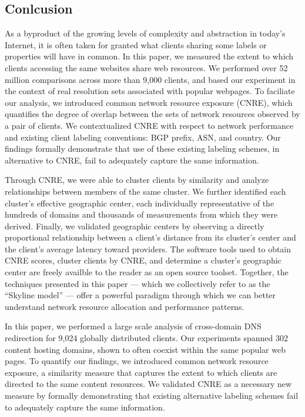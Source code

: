 \subsection{Conlcusion}

As a byproduct of the growing levels of complexity and abstraction in today's
Internet, it is often taken for granted what clients sharing some labels or
properties will have in common. In this paper, we measured the extent to which
clients accessing the same websites share web resources. We performed over 52
million comparisons across more than 9,000 clients, and based our experiment in
the context of real resolution sets associated with popular webpages. To
faciliate our analysis, we introduced common network resource exposure (CNRE),
which quantifies the degree of overlap between the sets of network resources
observed by a pair of clients. We contextualized CNRE with respect to network
performance and existing client labeling conventions: BGP prefix, ASN, and
country. Our findings formally demonstrate that use of these existing labeling
schemes, in alternative to CNRE, fail to adequately capture the same
information.

Through CNRE, we were able to cluster clients by similarity and analyze 
relationships between members of the same cluster. We further identified each
cluster's
effective geographic center, each individually representative of the hundreds
of domains and thousands of measurements from which they were derived. Finally,
we validated geographic centers by observing a directly proportional
relationship between a client's distance from its cluster's center and the
client's average latency toward providers. The software tools used to obtain
CNRE scores, cluster clients by CNRE, and determine a cluster's geographic
center are freely availble to the reader as an open source toolset. Together,
the techniques presented in this paper --- which we collectively refer to as the
``Skyline model'' --- offer a powerful paradigm through which we can better
understand network resource allocation and performance patterns. 



In this paper, we performed a large scale analysis of cross-domain DNS
redirection for 9,024 globally distributed clients. Our experiments spanned 
302 content hosting domains, shown to often coexist within the same popular web pages.
To quantify our findings, we introduced common network resource exposure, a
similarity measure that captures the extent to which clients are directed to the
same content resources. We validated CNRE as a necessary new measure by formally demonstrating that existing alternative labeling schemes fail to adequately
capture the same information.

